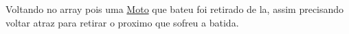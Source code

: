 Voltando no array pois uma \mbox{\hyperlink{class_moto}{Moto}} que bateu foi retirado de la, assim precisando voltar atraz para retirar o proximo que sofreu a batida. ~\newline
~\newline
~\newline
~\newline
~\newline
~\newline
~\newline
~\newline
~\newline
~\newline
~\newline
~\newline
~\newline
~\newline
~\newline
~\newline
~\newline
~\newline
~\newline
~\newline
~\newline
~\newline
~\newline
~\newline
~\newline
~\newline
~\newline
~\newline
~\newline
~\newline
~\newline
~\newline
~\newline
~\newline
~\newline
~\newline
~\newline
~\newline
~\newline
~\newline
~\newline
~\newline
~\newline
~\newline
~\newline
~\newline
~\newline
~\newline
~\newline
